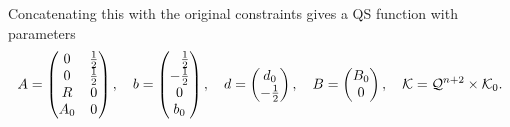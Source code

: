 Concatenating this with the original constraints gives a QS function with
parameters
\begin{equation*}
       A = \pmat{0&\tfrac{1}{2}\\0&\tfrac{1}{2}\\R&0\\A_0&0},
\quad  b = \pmat{{\phantom-\tfrac{1}{2}}\\-\tfrac{1}{2}\\0\\b_0},
\quad  d = \pmat{d_0\\-\tfrac{1}{2}},
\quad  B = \pmat{B_0\\0},
\quad  \mathcal{K} = \mathcal{Q}^{n+2}\times \mathcal{K}_0.
\end{equation*}
